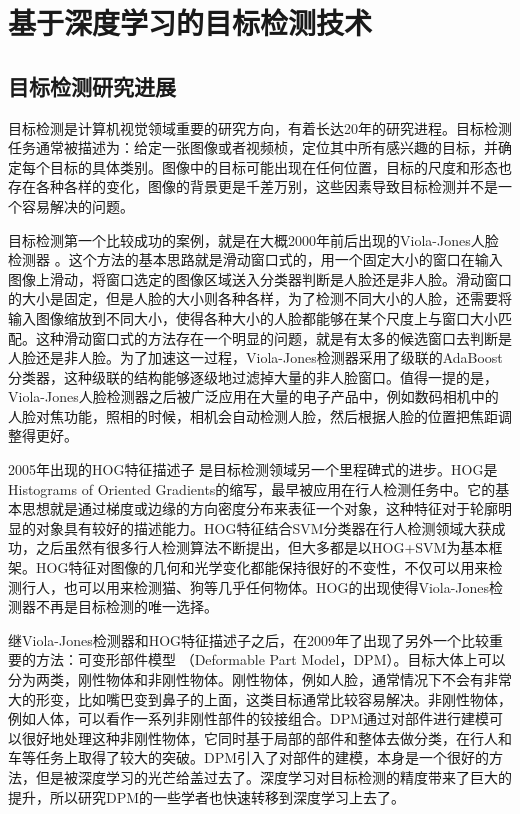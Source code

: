 \chapter{基于深度学习的目标检测技术}

\section{目标检测研究进展}
目标检测是计算机视觉领域重要的研究方向，有着长达20年的研究进程。目标检测任务通常被描述为：给定一张图像或者视频桢，定位其中所有感兴趣的目标，并确定每个目标的具体类别。图像中的目标可能出现在任何位置，目标的尺度和形态也存在各种各样的变化，图像的背景更是千差万别，这些因素导致目标检测并不是一个容易解决的问题。

目标检测第一个比较成功的案例，就是在大概2000年前后出现的Viola-Jones人脸检测器 \cite{viola-jones} \cite{via-jones-face}。这个方法的基本思路就是滑动窗口式的，用一个固定大小的窗口在输入图像上滑动，将窗口选定的图像区域送入分类器判断是人脸还是非人脸。滑动窗口的大小是固定，但是人脸的大小则各种各样，为了检测不同大小的人脸，还需要将输入图像缩放到不同大小，使得各种大小的人脸都能够在某个尺度上与窗口大小匹配。这种滑动窗口式的方法存在一个明显的问题，就是有太多的候选窗口去判断是人脸还是非人脸。为了加速这一过程，Viola-Jones检测器采用了级联的AdaBoost分类器，这种级联的结构能够逐级地过滤掉大量的非人脸窗口。值得一提的是，Viola-Jones人脸检测器之后被广泛应用在大量的电子产品中，例如数码相机中的人脸对焦功能，照相的时候，相机会自动检测人脸，然后根据人脸的位置把焦距调整得更好。

2005年出现的HOG特征描述子 \cite{hog} 是目标检测领域另一个里程碑式的进步。HOG是Histograms of Oriented Gradients的缩写，最早被应用在行人检测任务中。它的基本思想就是通过梯度或边缘的方向密度分布来表征一个对象，这种特征对于轮廓明显的对象具有较好的描述能力。HOG特征结合SVM分类器在行人检测领域大获成功，之后虽然有很多行人检测算法不断提出，但大多都是以HOG+SVM为基本框架。HOG特征对图像的几何和光学变化都能保持很好的不变性，不仅可以用来检测行人，也可以用来检测猫、狗等几乎任何物体。HOG的出现使得Viola-Jones检测器不再是目标检测的唯一选择。

继Viola-Jones检测器和HOG特征描述子之后，在2009年了出现了另外一个比较重要的方法：可变形部件模型 （Deformable Part Model，DPM）\cite{dpm}。目标大体上可以分为两类，刚性物体和非刚性物体。刚性物体，例如人脸，通常情况下不会有非常大的形变，比如嘴巴变到鼻子的上面，这类目标通常比较容易解决。非刚性物体，例如人体，可以看作一系列非刚性部件的铰接组合。DPM通过对部件进行建模可以很好地处理这种非刚性物体，它同时基于局部的部件和整体去做分类，在行人和车等任务上取得了较大的突破。DPM引入了对部件的建模，本身是一个很好的方法，但是被深度学习的光芒给盖过去了。深度学习对目标检测的精度带来了巨大的提升，所以研究DPM的一些学者也快速转移到深度学习上去了。

